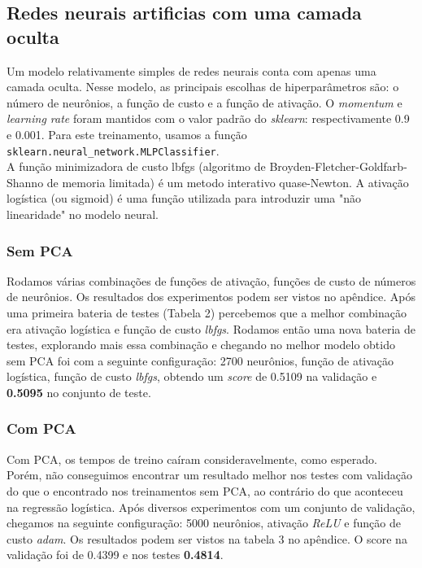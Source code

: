 \documentclass[conference]{IEEEtran}
\begin{document}
\subsection{Redes neurais artificias com uma camada oculta}

Um modelo relativamente simples de redes neurais conta com apenas uma camada oculta. Nesse modelo, as principais escolhas de hiperparâmetros são: o número de neurônios, a função de custo e a função de ativação. O \textit{momentum} e \textit{learning rate} foram mantidos com o valor padrão do \textit{sklearn}: respectivamente 0.9 e 0.001. Para este treinamento, usamos a função \texttt{sklearn.neural\_network.MLPClassifier}.\\
A função minimizadora de custo lbfgs (algoritmo de Broyden-Fletcher-Goldfarb-Shanno de memoria limitada) é um metodo interativo quase-Newton. A ativação logística (ou sigmoid) é uma função utilizada para introduzir uma "não linearidade" no modelo neural.

\subsubsection{Sem PCA}
Rodamos várias combinações de funções de ativação, funções de custo de números de neurônios. Os resultados dos experimentos podem ser vistos no apêndice. Após uma primeira bateria de testes (Tabela 2) percebemos que a melhor combinação era ativação logística e função de custo \textit{lbfgs}. Rodamos então uma nova bateria de testes, explorando mais essa combinação e chegando no melhor modelo obtido sem PCA foi com a seguinte configuração: 2700 neurônios, função de ativação logística, função de custo \textit{lbfgs}, obtendo um \textit{score} de 0.5109 na validação e \textbf{0.5095} no conjunto de teste.\\

\subsubsection{Com PCA}
Com PCA, os tempos de treino caíram consideravelmente, como esperado. Porém, não conseguimos encontrar um resultado melhor nos testes com validação do que o encontrado nos treinamentos sem PCA, ao contrário do que aconteceu na regressão logística. Após diversos experimentos com um conjunto de validação, chegamos na seguinte configuração: 5000 neurônios, ativação \textit{ReLU} e função de custo \textit{adam}. Os resultados podem ser vistos na tabela 3 no apêndice. O score na validação foi de 0.4399 e nos testes \textbf{0.4814}.
\end{document}
